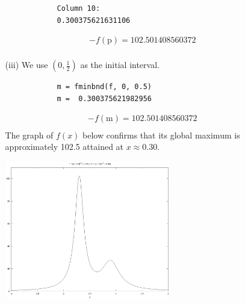 \documentclass[11pt,a4paper]{article}
\begin{document}
\begin{enumerate}
\begin{enumerate}
\begin{verbatim}
			Column 10:
			0.300375621631106
		\end{verbatim}
		\begin{align*}
			-f({\text{p}}) = 102.501408560372 \\
		\end{align*}
		\item[(iii)] We use $\left(0,\frac{1}{2}\right)$ as the initial interval.
		\begin{verbatim}
			m = fminbnd(f, 0, 0.5)
			m =  0.300375621982956
		\end{verbatim}
		\begin{align*}
			-f({\text{m}}) = 102.501408560372 \\
		\end{align*}
		The graph of $f(x)$ below confirms that its global maximum is approximately 102.5 attained at $x \approx 0.30$. 
		\begin{center}
			\includegraphics[width=0.6\textwidth]{fmax.eps}
		\end{center}
		

\end{enumerate}
\end{enumerate}
\end{document}

